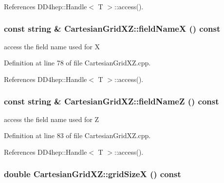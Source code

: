 References DD4hep::Handle$<$ T $>$::access().\hypertarget{class_d_d4hep_1_1_geometry_1_1_cartesian_grid_x_z_a13e87762dd76ef23cf8949d2b677d4b1}{
\subsubsection[{fieldNameX}]{\setlength{\rightskip}{0pt plus 5cm}const {\bf string} \& CartesianGridXZ::fieldNameX () const}}
\label{class_d_d4hep_1_1_geometry_1_1_cartesian_grid_x_z_a13e87762dd76ef23cf8949d2b677d4b1}


access the field name used for X 

Definition at line 78 of file CartesianGridXZ.cpp.

References DD4hep::Handle$<$ T $>$::access().\hypertarget{class_d_d4hep_1_1_geometry_1_1_cartesian_grid_x_z_ab211910357d8652983b32f7f2aabf1fb}{
\subsubsection[{fieldNameZ}]{\setlength{\rightskip}{0pt plus 5cm}const {\bf string} \& CartesianGridXZ::fieldNameZ () const}}
\label{class_d_d4hep_1_1_geometry_1_1_cartesian_grid_x_z_ab211910357d8652983b32f7f2aabf1fb}


access the field name used for Z 

Definition at line 83 of file CartesianGridXZ.cpp.

References DD4hep::Handle$<$ T $>$::access().\hypertarget{class_d_d4hep_1_1_geometry_1_1_cartesian_grid_x_z_adb5f3bad513ff48725d07c8ff202b750}{
\subsubsection[{gridSizeX}]{\setlength{\rightskip}{0pt plus 5cm}double CartesianGridXZ::gridSizeX () const}}
\label{class_d_d4hep_1_1_geometry_1_1_cartesian_grid_x_z_adb5f3bad513ff48725d07c8ff202b750}


